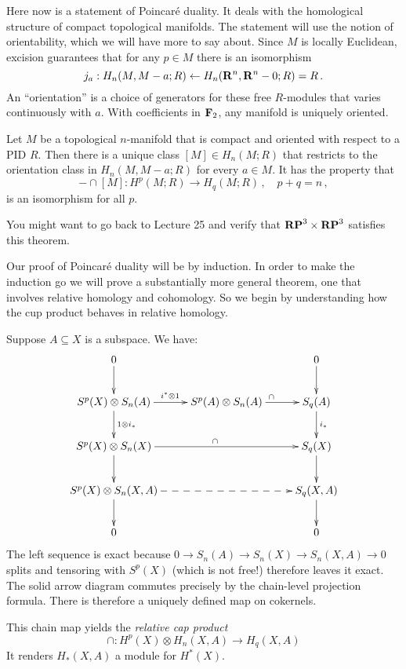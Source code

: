 Here now is a statement of Poincar\'e duality. It deals with the 
homological structure of compact topological manifolds. 
The statement will use the notion of orientability, which we will 
have more to say about. Since $M$ is locally Euclidean, excision guarantees 
that for any $p\in M$ there is an isomorphism
\[
j_a:H_n(M,M-a;R)\leftarrow H_n(\mathbf R^n,\mathbf R^n-0;R)=R \,.
\]
An ``orientation'' is a choice of generators
for these free $R$-modules that varies continuously with $a$. 
With coefficients in $\mathbf F_2$, any manifold is uniquely oriented. 
\begin{theorem}
Let $M$ be a topological $n$-manifold that is compact and oriented with 
respect to a PID $R$. Then there is a unique class $[M]\in H_n(M;R)$ that
restricts to the orientation class in $H_n(M,M-a;R)$ for every $a\in M$. 
It has the property that
\[
-\cap[M]:H^p(M;R)\to H_q(M;R)\,,\quad p+q=n\,,
\]
is an isomorphism for all $p$.
\end{theorem}

You might want to go back to Lecture 25 and verify that $\mathbf{RP}^3\times\mathbf{RP}^3$
satisfies this theorem. 

Our proof of Poincar\'e duality will be by induction. In order to make the
induction go we will prove a substantially more general theorem, one that
involves relative homology and cohomology. So we begin by understanding
how the cup product behaves in relative homology.

Suppose $A\subseteq X$ is a subspace. We have:
\begin{equation*}
\xymatrix{
	0\ar[d] & & 0\ar[d]\\
	S^p(X)\otimes S_n(A)\ar[d]^{1\otimes i_\ast}\ar[r]^{i^\ast\otimes 1} & S^p(A)\otimes S_n(A)\ar[r]^{\cap} & S_q(A)\ar[d]^{i_*}\\
	S^p(X)\otimes S_n(X)\ar[rr]^\cap\ar[d] & & S_q(X)\ar[d]\\
	S^p(X)\otimes S_n(X,A)\ar[d]\ar@{-->}[rr] & & S_q(X,A)\ar[d]\\
	0 & & 0
}
\end{equation*}
The left sequence is exact because $0\to S_n(A)\to S_n(X)\to S_n(X,A)\to 0$ splits and tensoring with $S^p(X)$ (which is not free!) therefore leaves it exact. The solid arrow diagram commutes precisely by the chain-level projection formula. There is therefore a uniquely defined map on cokernels.

This chain map yields the {\em relative cap product}
\[
\cap: H^p(X)\otimes H_n(X,A)\to H_q(X,A)
\]
It renders $ H_\ast(X,A)$ a module for  $ H^\ast(X)$.


